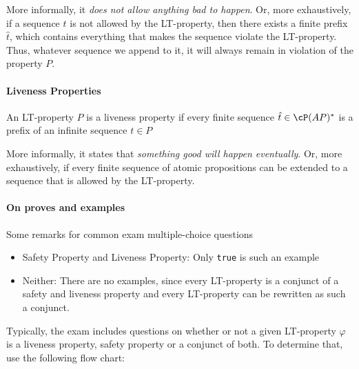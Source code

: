 \inlineintuition More informally, it \textit{does not allow anything bad to happen}. Or, more exhaustively, if a sequence $t$ is not allowed by the LT-property,
then there exists a finite prefix $\hat{t}$, which contains everything that makes the sequence violate the LT-property.
Thus, whatever sequence we append to it, it will always remain in violation of the property $P$.


\paragraph{Liveness Properties}
\inlinedefinition An LT-property $P$ is a liveness property if every finite sequence $\hat{t} \in \cP(AP)^*$ is a prefix of an infinite sequence $t \in P$

\inlineintuition More informally, it states that \textit{something good will happen eventually}.
Or, more exhaustively, if every finite sequence of atomic propositions can be extended to a sequence that is allowed by the LT-property.


\paragraph{On proves and examples}
Some remarks for common exam multiple-choice questions
\begin{itemize}
    \item Safety Property and Liveness Property: Only \texttt{true} is such an example
    \item Neither: There are no examples, since every LT-property is a conjunct of a safety and liveness property and every LT-property can be rewritten as such a conjunct.
\end{itemize}

Typically, the exam includes questions on whether or not a given LT-property $\varphi$ is a liveness property, safety property or a conjunct of both.
To determine that, use the following flow chart:
\begin{center}
\end{center}
